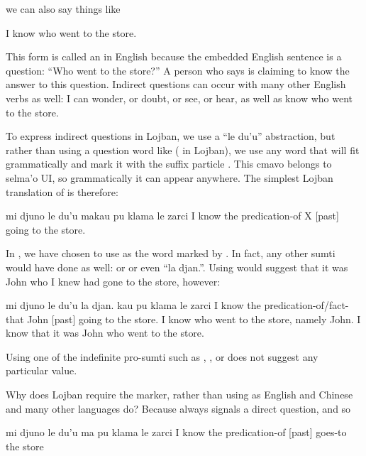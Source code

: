 {\noindent}we can also say things like
\begin{example}
I know who went to the store.
\end{example}

This form is called an  in English because
    the embedded English sentence is a question: ``Who went to the
    store?'' A person who says  is
    claiming to know the answer to this question. Indirect
    questions can occur with many other English verbs as well: I
    can wonder, or doubt, or see, or hear, as well as know who went
    to the store. 

To express indirect questions in Lojban, we use a ``le
    du'u'' abstraction, but rather than using a question word like
     ( in Lojban), we use any word that will fit
    grammatically and mark it with the suffix particle .
    This cmavo belongs to selma'o UI, so grammatically it can
    appear anywhere. The simplest Lojban translation of  is therefore:
\begin{example}
mi djuno le du'u\n
\T	makau pu klama le zarci\n
I know the predication-of\n
\T	X  [past] going to the store.
\end{example}

In , we have chosen to use
     as the word marked by . In fact, any other sumti
    would have done as well:  or  or even ``la
    djan.''. Using  would suggest that it was John who
    I knew had gone to the store, however:
\begin{example}
mi djuno le du'u\n
\T	la djan. kau pu\n
\T	klama le zarci\n
I know the predication-of/fact-that\n
\T	John  [past]\n
\T	going to the store.\n
I know who went to the store, namely John.\n
I know that it was John who went to the store.
\end{example}

Using one of the indefinite pro-sumti such as ,
    , or  does not suggest any particular value.

Why does Lojban require the  marker, rather than
    using  as English and Chinese and many other languages
    do? Because  always signals a direct question, and so
\begin{example}
mi djuno le du'u\n
\T	ma pu klama le zarci\n
I know the predication-of\n
\T	{} [past] goes-to the store
\end{example}

